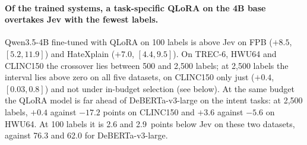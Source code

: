 \begin{table}[t]
  \centering
  \caption{\textbf{Of the three trained systems, a task QLoRA on Qwen3.5-4B overtakes Jev with the fewest labels;
  DeBERTa-v3-large does not clearly overtake it on CLINC150.} Crossover budget vs Jev (Macro-F1): the interval between the largest budget whose 95\% interval includes or
  lies below zero and the smallest budget whose interval lies above zero. The interpolation uses the point estimate and
  can therefore fall below the interval, e.g.\ for QLoRA on TREC-6, where the estimate at 500 labels is positive but its
  interval still includes zero. Interp.: budget at which the linearly
  interpolated point estimate first crosses zero (rough guide; \citealt{lescao2021howmany}). Budgets: 100, 250, 500,
  1{,}000, 2{,}500, 5{,}000 (HateXplain, HWU64, CLINC150 only) and full data; QLoRA: 100, 500, 2{,}500.}
  \label{tab:crossover}
  \scriptsize
  \setlength{\tabcolsep}{4pt}
  
\end{table}

\paragraph{Of the trained systems, a task-specific QLoRA on the 4B base overtakes Jev with the fewest labels.}
Qwen3.5-4B fine-tuned with QLoRA on 100 labels is above Jev on FPB ($+8.5$, $[5.2, 11.9]$) and HateXplain ($+7.0$,
$[4.4, 9.5]$). On TREC-6, HWU64 and CLINC150 the crossover lies between 500 and 2{,}500 labels; at 2{,}500 labels the
interval lies above zero on all five datasets, on CLINC150 only just ($+0.4$, $[0.03, 0.8]$) and not under in-budget
selection (see below). At the same budget the
QLoRA model is far ahead of DeBERTa-v3-large on the intent tasks: at 2{,}500 labels, $+0.4$ against $-17.2$ points on
CLINC150 and $+3.6$ against $-5.6$ on HWU64. At 100 labels it is 2.6 and 2.9~points below Jev on these two datasets,
against 76.3 and 62.0 for DeBERTa-v3-large.

